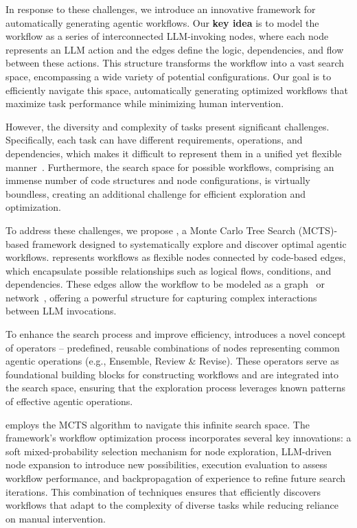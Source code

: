 In response to these challenges, we introduce an innovative framework for automatically generating agentic workflows. Our \textbf{key idea} is to model the workflow as a series of interconnected LLM-invoking nodes, where each node represents an LLM action and the edges define the logic, dependencies, and flow between these actions. This structure transforms the workflow into a vast search space, encompassing a wide variety of potential configurations. Our goal is to efficiently navigate this space, automatically generating optimized workflows that maximize task performance while minimizing human intervention.

However, the diversity and complexity of tasks present significant challenges. Specifically, each task can have different requirements, operations, and dependencies, which makes it difficult to represent them in a unified yet flexible manner~\citep{Chen2021Humaneval, cobbe2021gsm8k, zhi2018hot, DBLP:conf/icde/LuoQ0018}. 
Furthermore, the search space for possible workflows, comprising an immense number of code structures and node configurations, is virtually boundless, creating an additional challenge for efficient exploration and optimization.

To address these challenges, we propose \model, a Monte Carlo Tree Search (MCTS)-based framework designed to systematically explore and discover optimal agentic workflows. \model represents workflows as flexible nodes connected by code-based edges, which encapsulate possible relationships such as logical flows, conditions, and dependencies. These edges allow the workflow to be modeled as a graph~\citep{zhuge2024gptswarm} or network~\citep{liu2023dynamic}, offering a powerful structure for capturing complex interactions between LLM invocations.

To enhance the search process and improve efficiency, \model introduces a novel concept of operators -- 
 predefined, reusable combinations of nodes representing common agentic operations (e.g., Ensemble, Review \& Revise). These operators serve as foundational building blocks for constructing workflows and are integrated into the search space, ensuring that the exploration process leverages known patterns of effective agentic operations.

\model employs the MCTS algorithm to navigate this infinite search space. The framework’s workflow optimization process incorporates several key innovations: a soft mixed-probability selection mechanism for node exploration, LLM-driven node expansion to introduce new possibilities, execution evaluation to assess workflow performance, and backpropagation of experience to refine future search iterations. This combination of techniques ensures that \model efficiently discovers workflows that adapt to the complexity of diverse tasks while reducing reliance on manual intervention.

